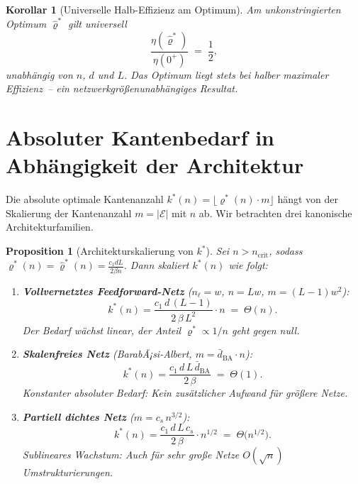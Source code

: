 ﻿\documentclass[12pt, a4paper, openany]{report}
\newtheorem{proposition}[theorem]{Proposition}
\newtheorem{corollary}[theorem]{Korollar}
\newcommand{\calE}{\mathcal{E}}
\begin{document}
\begin{corollary}[Universelle Halb-Effizienz am Optimum]
\label{cor:half_efficiency}
Am unkonstringierten Optimum $\hat\varrho^*$ gilt universell
\[
  \frac{\eta(\hat\varrho^*)}{\eta(0^+)} \;=\; \frac{1}{2},
\]
unabhängig von $n$, $d$ und $L$.  Das Optimum liegt stets bei halber
maximaler Effizienz~-- ein netzwerkgrößenunabhängiges Resultat.
\end{corollary}

\section{Absoluter Kantenbedarf in Abhängigkeit der Architektur}
\label{sec:scaling_arch}

Die absolute optimale Kantenanzahl $k^*(n) = \lfloor\varrho^*(n)\cdot m\rfloor$
hängt von der Skalierung der Kantenanzahl $m = |\calE|$ mit $n$ ab.  Wir
betrachten drei kanonische Architekturfamilien.

\begin{proposition}[Architekturskalierung von $k^*$]
\label{prop:arch_scaling}
Sei $n > n_{\mathrm{crit}}$, sodass $\varrho^*(n) = \hat\varrho^*(n)
= \frac{c_1 dL}{2\beta n}$.  Dann skaliert $k^*(n)$ wie folgt:
\begin{enumerate}[label=(\roman*)]
  \item \textbf{Vollvernetztes Feedforward-Netz} ($n_\ell = w$, $n = Lw$,
    $m = (L-1)w^2$):
    \begin{equation}
      \label{eq:k_dense}
      k^*(n) = \frac{c_1\,d\,(L-1)}{2\,\beta\,L^2}\cdot n
      \;=\; \Theta(n).
    \end{equation}
    Der Bedarf wächst \emph{linear}, der Anteil $\varrho^* \propto 1/n$ geht
    gegen null.
  \item \textbf{Skalenfreies Netz} (BarabÃ¡si-Albert, $m = \bar{d}_{\mathrm{BA}}\cdot n$):
    \begin{equation}
      \label{eq:k_sparse}
      k^*(n) = \frac{c_1\,d\,L\,\bar{d}_{\mathrm{BA}}}{2\,\beta}
      \;=\; \Theta(1).
    \end{equation}
    Konstanter absoluter Bedarf: Kein zusätzlicher Aufwand für größere Netze.
  \item \textbf{Partiell dichtes Netz} ($m = c_s\,n^{3/2}$):
    \begin{equation}
      \label{eq:k_semi}
      k^*(n) = \frac{c_1\,d\,L\,c_s}{2\,\beta}\cdot n^{1/2}
      \;=\; \Theta\!\bigl(n^{1/2}\bigr).
    \end{equation}
    Sublineares Wachstum: Auch für sehr große Netze $O(\sqrt{n})$
    Umstrukturierungen.
\end{enumerate}
\end{proposition}
\end{document}
